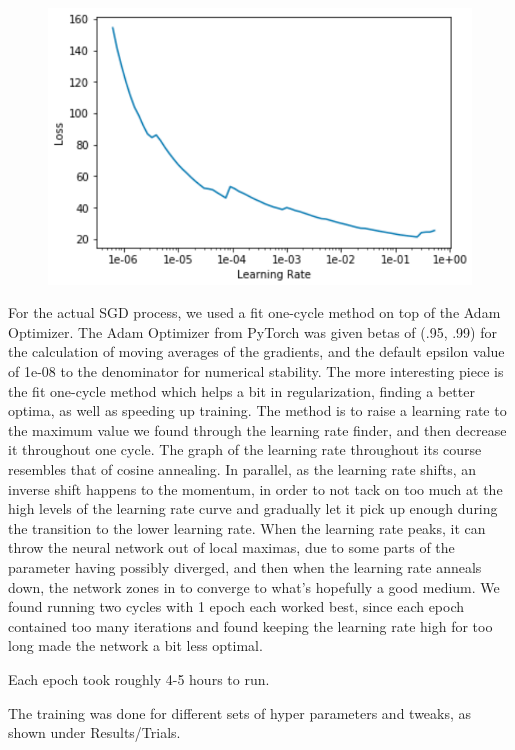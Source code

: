 \documentclass[10pt,twocolumn,letterpaper]{article}
\begin{document}
  \begin{figure}[]
    \centering
    \includegraphics[width=0.8\linewidth]{img/learningRate.png}
    \label{learningRate}
  \end{figure}

  For the actual SGD process, we used a fit one-cycle method on top of the Adam
  Optimizer. The Adam Optimizer from PyTorch was given betas of (.95, .99) for
  the calculation of moving averages of the gradients, and the default epsilon
  value of 1e-08 to the denominator for numerical stability. The more
  interesting piece is the fit one-cycle method which helps a bit in
  regularization, finding a better optima, as well as speeding up training. The
  method is to raise a learning rate to the maximum value we found through the
  learning rate finder, and then decrease it throughout one cycle. The graph of
  the learning rate throughout its course resembles that of cosine annealing. In
  parallel, as the learning rate shifts, an inverse shift happens to the
  momentum, in order to not tack on too much at the high levels of the learning
  rate curve and gradually let it pick up enough during the transition to the
  lower learning rate. When the learning rate peaks, it can throw the neural
  network out of local maximas, due to some parts of the parameter having
  possibly diverged, and then when the learning rate anneals down, the network
  zones in to converge to what’s hopefully a good medium. We found running two
  cycles with 1 epoch each worked best, since each epoch contained too many
  iterations and found keeping the learning rate high for too long made the
  network a bit less optimal.

  Each epoch took roughly 4-5 hours to run.

  The training was done for different sets of hyper parameters and tweaks, as
  shown under Results/Trials.
\end{document}
